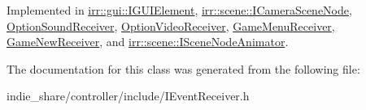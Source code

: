Implemented in \hyperlink{classirr_1_1gui_1_1IGUIElement_a54b1799e21722d9e6ce5b8e4bdb2e80a}{irr\+::gui\+::\+I\+G\+U\+I\+Element}, \hyperlink{classirr_1_1scene_1_1ICameraSceneNode_af27145518f43a17f803cdea086f68f3c}{irr\+::scene\+::\+I\+Camera\+Scene\+Node}, \hyperlink{classOptionSoundReceiver_ae7c9643b12df38a45d4e3d629274019c}{Option\+Sound\+Receiver}, \hyperlink{classOptionVideoReceiver_a203025900c489eb2df12a6b3471c3caa}{Option\+Video\+Receiver}, \hyperlink{classGameMenuReceiver_af6774556abc7e3718b7bf904cc62ead0}{Game\+Menu\+Receiver}, \hyperlink{classGameNewReceiver_ad9ec097d8b46946ed1a21c24463fc0b6}{Game\+New\+Receiver}, and \hyperlink{classirr_1_1scene_1_1ISceneNodeAnimator_aca20b841bb586cd9654464b001a7b6aa}{irr\+::scene\+::\+I\+Scene\+Node\+Animator}.



The documentation for this class was generated from the following file\+:\begin{DoxyCompactItemize}
\item 
indie\+\_\+share/controller/include/I\+Event\+Receiver.\+h\end{DoxyCompactItemize}
